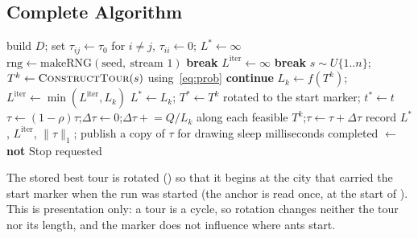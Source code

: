 \documentclass[11pt,a4paper]{article}
\begin{document}
\subsection{Complete Algorithm}

\begin{algorithm}[htbp]
\caption{Ant System as implemented in \texttt{Model::runACO()}}
\begin{algorithmic}[1]
\State build $D$; set $\tau_{ij}\gets\tau_0$ for $i\ne j$, $\tau_{ii}\gets0$; $L^\ast\gets\infty$
\State $\text{rng}\gets\text{makeRNG}(\text{seed},\ \text{stream }1)$
   \textbf{break} \EndIf
  \State $L^{\text{iter}}\gets\infty$
     \textbf{break} \EndIf
    \State $s\sim U\{1..n\}$;\quad $T^k\gets\textsc{ConstructTour}(s)$ using~\eqref{eq:prob}
     \textbf{continue} \EndIf
    \State $L_k\gets f(T^k)$;\quad $L^{\text{iter}}\gets\min(L^{\text{iter}},L_k)$
     \State $L^\ast\gets L_k$; $T^\ast\gets T^k$ rotated to the start marker; $t^\ast\gets t$ \EndIf
  \EndFor
  \State $\tau\gets(1-\rho)\tau$;\quad $\Delta\tau\gets0$;\quad $\Delta\tau\mathrel{+}=Q/L_k$ along each feasible $T^k$;\quad $\tau\gets\tau+\Delta\tau$
  \State record $L^\ast$, $L^{\text{iter}}$, $\lVert\tau\rVert_1$; publish a copy of $\tau$ for drawing 
  \State sleep  milliseconds 
\EndFor
\State completed $\gets$ \textbf{not} Stop requested
\end{algorithmic}
\end{algorithm}

The stored best tour is rotated () so that it begins at the city that carried the
start marker when the run was started (the anchor is read once, at the start of ). This is presentation only: a tour is a cycle, so rotation changes neither the tour nor its
length, and the marker does not influence where ants start.
\end{document}
